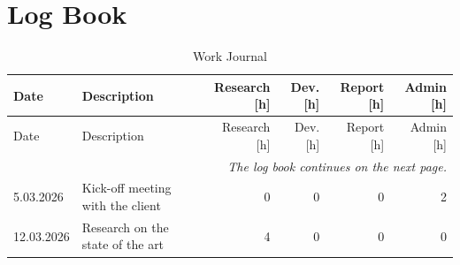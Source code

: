 %

\chapter{Log Book}

\begin{landscape}

	\begin{longtable}[c]{lp{10cm}rrrr}
		\caption{Work Journal}                                                                                               \\

		\hline
		Date & Description                                                        & Research [h] & Dev. [h] & Report [h] & Admin [h] \\
		\hline
		\endfirsthead

		\hline
		Date & Description                                                        & Research [h] & Dev. [h] & Report [h] & Admin [h] \\
		\hline
		\endhead

		\multicolumn{6}{r}{\small \it The log book continues on the next page.}                                          \\
		\normalsize
		\endfoot

		\hline
		\endlastfoot


		5.03.2026
		     & Kick-off meeting with the client \lipsum[1-1]
		     & 0                                                                                                                   %
		     & 0                                                                                                                   %
		     & 0                                                                                                                   %
		     & 2                                                                                                                   \\ %

		12.03.2026
		     & Research on the state of the art
		     & 4                                                                                                                   %
		     & 0                                                                                                                   %
		     & 0                                                                                                                   %
		     & 0                                                                                                                   \\ %


\end{longtable}
\end{landscape}
